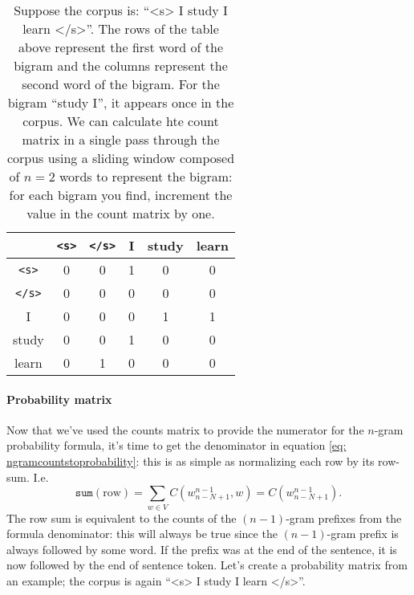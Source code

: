 \documentclass[12pt]{article}
\begin{document}
\begin{table}[h]
  \begin{center}
    \begin{tabular}{|c|c c c c c|}
      \hline
      & \texttt{<s>} & \texttt{</s>} & I & study & learn \\
      \hline
      \texttt{<s>} & 0 & 0 & 1 & 0 & 0 \\
      \texttt{</s>} & 0 & 0 & 0 & 0 & 0 \\
      I & 0 & 0 & 0 & 1 & 1 \\
      study & 0 & 0 & {\cellcolor{orange!80} 1} & 0 & 0 \\
      learn & 0 & 1 & 0 & 0 & 0 \\
      \hline
    \end{tabular}
    \caption{Suppose the corpus is: ``<s> I study I learn </s>''. The rows of       the table above represent the first word of the bigram and the columns represent
      the second word of the bigram. For the bigram ``study I'', it appears once in the corpus. We can calculate hte count matrix in a single pass through the corpus using a sliding window composed of $n=2$ words to represent the bigram: for each bigram you find, increment the value in the count matrix by one.}
  \end{center}
\end{table}

\paragraph{Probability matrix} Now that we've used the counts matrix to provide the numerator for the $n$-gram probability formula, it's time to get the denominator in equation \ref{eq: ngramcountstoprobability}: this is as simple as normalizing each row by its row-sum. I.e.
\[
  \texttt{sum}(\textrm{row}) = \sum_{w \in V} C(w_{n-N+1}^{n-1}, w) = C(w_{n-N+1}^{n-1}).
\]
The row sum is equivalent to the counts of the $(n-1)$-gram prefixes from the formula denominator: this will always be true since the $(n-1)$-gram prefix is always followed by some word. If the prefix was at the end of the sentence, it is now followed by the end of sentence token. Let's create a probability matrix from an example; the corpus is again ``<s> I study I learn </s>''.
\end{document}

